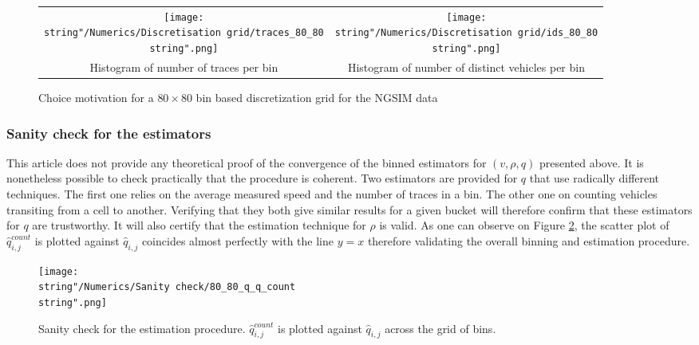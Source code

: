 \documentclass[preprint]{elsarticle}
\begin{document}
\begin{figure}[H]
\centering
\begin{tabular}{cc}
\texttt{[image: \\string"/Numerics/Discretisation grid/traces\_80\_80\\string".png]} & \texttt{[image: \\string"/Numerics/Discretisation grid/ids\_80\_80\\string".png]}\tabularnewline
Histogram of number of traces per bin & Histogram of number of distinct vehicles per bin \tabularnewline
\end{tabular}
\caption{Choice motivation for a $80\times 80$ bin based discretization
grid for the NGSIM data}
\label{fig:Grid control}
\end{figure}



\subsubsection{Sanity check for the estimators}

This article does not provide any theoretical proof of the convergence
of the binned estimators for $\left(v,\rho,q\right)$ presented above.
It is nonetheless possible to check practically that the procedure
is coherent. Two estimators are provided for $q$ that use radically
different techniques. The first one relies on the average measured
speed and the number of traces in a bin. The other one on counting
vehicles transiting from a cell to another. Verifying that they both
give similar results for a given bucket will therefore confirm that
these estimators for $q$ are trustworthy. It will also certify that
the estimation technique for $\rho$ is valid. As one can observe
on Figure \ref{fig:Sanity-check}, the scatter plot of $\widehat{q}_{i,j}^{count}$
is plotted against $\widehat{q}_{i,j}$ coincides almost perfectly
with the line $y=x$ therefore validating the overall binning and
estimation procedure.

\begin{figure}[H]
\centering
\texttt{[image: \\string"/Numerics/Sanity check/80\_80\_q\_q\_count\\string".png]}
\protect\caption{Sanity check for the estimation procedure. $\widehat{q}_{i,j}^{count}$
is plotted against $\widehat{q}_{i,j}$ across the grid of bins.
\label{fig:Sanity-check}}
\end{figure}
\end{document}

